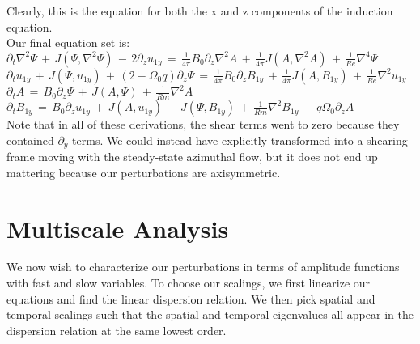 \documentclass[letterpaper,12pt]{article}
\newcommand\reye{\mathrel{Re}}
\newcommand\reym{\mathrel{Rm}}
\begin{document}
Clearly, this is the equation for both the x and z components of the induction equation. \\

Our final equation set is: \\

$\partial_t \nabla^2 \Psi \, + \, J\left(\Psi, \nabla^2 \Psi\right) \, - \, 2 \partial_z u_{1y} \, = \, \frac{1}{4\pi} B_0 \partial_z \nabla^2 A \, + \, \frac{1}{4\pi}J\left(A, \nabla^2 A \right) \, + \, \frac{1}{\reye}\nabla^4 \Psi$ \\

$\partial_t u_{1y} \, + \, J\left(\Psi, u_{1y}\right) \, + \, \left(2 - \Omega_0 q\right) \partial_z \Psi \, = \, \frac{1}{4\pi}B_0\partial_z B_{1y} \, + \, \frac{1}{4\pi} J\left(A, B_{1y}\right) \, + \, \frac{1}{\reye} \nabla^2 u_{1y}$ \\

$\partial_t A \, = \, B_0 \partial_z \Psi \, + \, J\left(A, \Psi\right) \, + \, \frac{1}{Rm} \nabla^2 A$ \\

$\partial_t B_{1y} \, = \, B_0 \partial_z u_{1y} \, + \, J\left(A, u_{1y}\right) \, - \, J\left(\Psi, B_{1y}\right) \, + \, \frac{1}{\reym} \nabla^2 B_{1y}  \, - \, q \Omega_0 \partial_z A$ \\

Note that in all of these derivations, the shear terms went to zero because they contained $\partial_y$ terms. We could instead have explicitly transformed into a shearing frame moving with the steady-state azimuthal flow, but it does not end up mattering because our perturbations are axisymmetric. \\

\section*{Multiscale Analysis}

We now wish to characterize our perturbations in terms of amplitude functions with fast and slow variables. To choose our scalings, we first linearize our equations and find the linear dispersion relation. We then pick spatial and temporal scalings such that the spatial and temporal eigenvalues all appear in the dispersion relation at the same lowest order. \\
\end{document}
